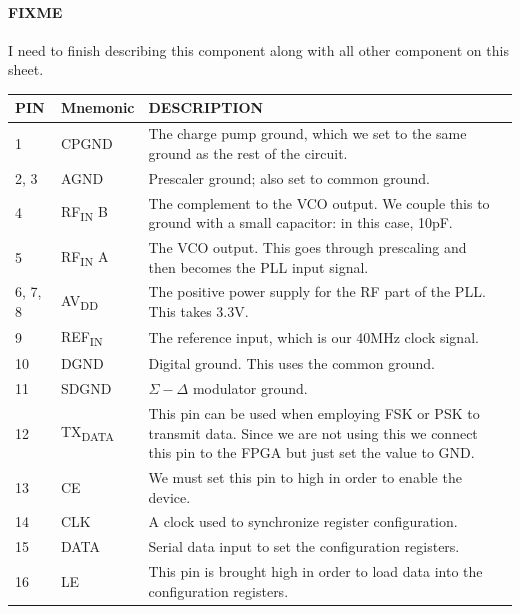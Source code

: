 \paragraph{FIXME} I need to finish describing this component along with all other component on this
sheet.

\label{tab:adf4158-pins}
\begin{tabularx}{\textwidth}{l l X>{\raggedright\arraybackslash}X}
        \caption{All ADF4158 pin connections.} \\
        \toprule
        \textbf{PIN} & \textbf{Mnemonic} & \textbf{DESCRIPTION} \\
        \midrule

        \endhead{}

        1 & CPGND & The charge pump ground, which we set to the same ground as the rest of the circuit. \\
        2, 3 & AGND & Prescaler ground; also set to common ground. \\
        4 & RF\textsubscript{IN} B & The complement to the VCO output. We couple this to ground with a
        small capacitor: in this case, 10pF. \\
        5 & RF\textsubscript{IN} A & The VCO output. This goes through prescaling and then becomes the PLL
        input signal. \\
        6, 7, 8 & AV\textsubscript{DD} & The positive power supply for the RF part of the PLL. This takes
        3.3V. \\
        9 & REF\textsubscript{IN} & The reference input, which is our 40MHz clock signal. \\
        10 & DGND & Digital ground. This uses the common ground. \\
        11 & SDGND & $\Sigma-\Delta$ modulator ground. \\
        12 & TX\textsubscript{DATA} & This pin can be used when employing FSK or PSK to transmit
        data. Since we are not using this we connect this pin to the FPGA
        but just set the value to GND. \\
        13 & CE & We must set this pin to high in order to enable the device. \\
        14 & CLK & A clock used to synchronize register configuration. \\
        15 & DATA & Serial data input to set the configuration registers. \\
        16 & LE & This pin is brought high in order to load data into the configuration registers. \\

\end{tabularx}
